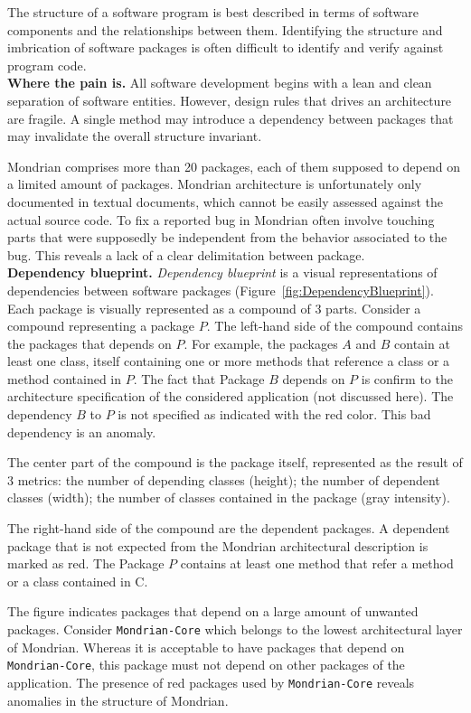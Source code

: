 \documentclass[runningheads]{llncs}
\newcommand{\ct}{\lstinline[backgroundcolor=\color{white},basicstyle=\footnotesize\ttfamily]}
\newcommand{\figref}[1]{Figure~\ref{fig:#1}}
\newcommand{\myparagraph}[1]{\noindent \textbf{#1.}}
\begin{document}
The structure of a software program is best described in terms of software components and the relationships between them. Identifying the structure and imbrication of software packages is often difficult to identify and verify against program code.\\

\myparagraph{Where the pain is}
All software development begins with a lean and clean separation of software entities. However, design rules that drives an architecture are fragile. A single method may introduce a dependency between packages that may invalidate the overall structure invariant. 

Mondrian comprises more than 20 packages, each of them supposed to depend on a limited amount of packages. Mondrian architecture is unfortunately only documented in textual documents, which cannot be easily assessed against the actual source code. To fix a reported bug in Mondrian often involve touching parts that were supposedly be independent from the behavior associated to the bug. This reveals a lack of a clear delimitation between package.\\

\myparagraph{Dependency blueprint}
\emph{Dependency blueprint} is a visual representations of dependencies between software packages (\figref{DependencyBlueprint}). Each package is visually represented as a compound of 3 parts. Consider a compound representing a package $P$. The left-hand side of the compound contains the packages that depends on $P$. For example, the packages $A$ and $B$ contain at least one class, itself containing one or more methods that reference a class or a method contained in $P$. The fact that Package $B$ depends on $P$ is confirm to the architecture specification of the considered application (not discussed here). The dependency $B$ to $P$ is not specified as indicated with the red color. This bad dependency is an anomaly.

The center part of the compound is the package itself, represented as the result of 3 metrics: the number of depending classes (height); the number of dependent classes (width); the number of classes contained in the package (gray intensity). 

The right-hand side of the compound are the dependent packages. A dependent package that is not expected from the Mondrian architectural description is marked as red. The Package $P$ contains at least one method that refer a method or a class contained in C.

The figure indicates packages that depend on a large amount of unwanted packages. Consider \ct{Mondrian-Core} which belongs to the lowest architectural layer of Mondrian. Whereas it is acceptable to have packages that depend on \ct{Mondrian-Core}, this package must not depend on other packages of the application. The presence of red packages used by \ct{Mondrian-Core} reveals anomalies in the structure of Mondrian.
\end{document}
